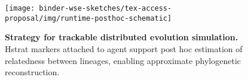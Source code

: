\begin{figure}
  \vspace{2ex}
    \centering
  \texttt{[image: binder-wse-sketches/tex-access-proposal/img/runtime-posthoc-schematic]}
  \vspace{-1.5ex}
    \caption{\textbf{Strategy for trackable distributed evolution simulation.}
    \footnotesize %
    Hstrat markers attached to agent support post hoc estimation of relatedness between lineages, enabling approximate phylogenetic reconstruction.
    }
    \label{fig:runtime-posthoc-schematic}
\vspace{-0.2in}
\end{figure}
